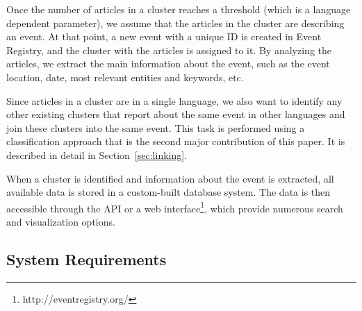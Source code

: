 \documentclass[twoside,11pt]{article}
\begin{document}
Once the number of articles in a cluster reaches a threshold (which is a language dependent parameter), we assume that the articles in the cluster are describing an event. At that point, a new event with a unique ID is created in Event Registry, and the cluster with the articles is assigned to it. By analyzing the articles, we extract the main information about the event, such as the event location, date, most relevant entities and keywords, etc.

Since articles in a cluster are in a single language, we also want to identify any other existing clusters that report about the same event in other languages and join these clusters into the same event. This task is performed using a classification approach that is the second major contribution of this paper. It is described in detail in Section~\ref{sec:linking}.

When a cluster is identified and information about the event is extracted, all available data is stored in a custom-built database system. The data is then accessible through the API or a web interface\footnote{http://eventregistry.org/}, which provide numerous search and visualization options.


\subsection{System Requirements}
\label{sec:sysreq}
\end{document}
